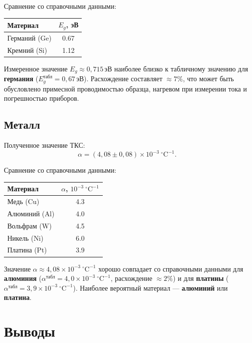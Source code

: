 \documentclass[a4paper,14pt]{article}
\begin{document}
Сравнение со справочными данными:

\begin{table}[H]
\centering
\begin{tabular}{|l|c|}
\hline
\textbf{Материал} & $E_g$, эВ \\
\hline
Германий (Ge) & 0.67 \\
Кремний (Si)  & 1.12 \\
\hline
\end{tabular}
\end{table}

Измеренное значение $E_g \approx 0{,}715$\,эВ наиболее близко к табличному значению для \textbf{германия} ($E_g^\text{табл} = 0{,}67$\,эВ). Расхождение составляет $\approx 7\%$, что может быть обусловлено примесной проводимостью образца, нагревом при измерении тока и погрешностью приборов.

\subsection*{Металл}

Полученное значение ТКС:
\[
    \alpha = (4{,}08 \pm 0{,}08)\times10^{-3}\ ^{\circ}\mathrm{C}^{-1}.
\]

Сравнение со справочными данными:

\begin{table}[H]
\centering
\begin{tabular}{|l|c|}
\hline
\textbf{Материал} & $\alpha$, $10^{-3}\ ^{\circ}\mathrm{C}^{-1}$ \\
\hline
Медь (Cu)      & 4.3 \\
Алюминий (Al)  & 4.0 \\
Вольфрам (W)   & 4.5 \\
Никель (Ni)    & 6.0 \\
Платина (Pt)   & 3.9 \\
\hline
\end{tabular}
\end{table}

Значение $\alpha \approx 4{,}08\times10^{-3}\ ^{\circ}\mathrm{C}^{-1}$ хорошо совпадает со справочными данными для \textbf{алюминия} ($\alpha^\text{табл} = 4{,}0\times10^{-3}\ ^{\circ}\mathrm{C}^{-1}$, расхождение $\approx 2\%$) и для \textbf{платины} ($\alpha^\text{табл} = 3{,}9\times10^{-3}\ ^{\circ}\mathrm{C}^{-1}$). Наиболее вероятный материал — \textbf{алюминий} или \textbf{платина}.

\section{Выводы}
\end{document}
